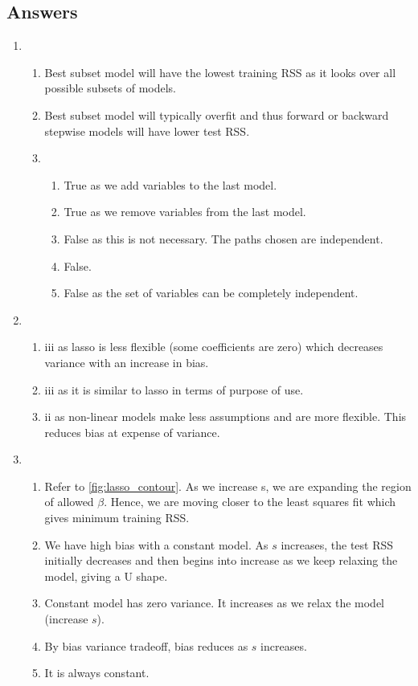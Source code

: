 \documentclass[../statistical_learning_notes.tex]{subfiles}
\begin{document}
    \subsection{Answers}
    \begin{enumerate}
        \item
        \begin{enumerate}
            \item Best subset model will have the lowest training RSS as it looks over all possible subsets of models.
            \item Best subset model will typically overfit and thus forward or backward stepwise models will have lower test RSS.
            \item
            \begin{enumerate}
                \item True as we add variables to the last model.
                \item True as we remove variables from the last model.
                \item False as this is not necessary. The paths chosen are independent.
                \item False.
                \item False as the set of variables can be completely independent.
            \end{enumerate}
        \end{enumerate}

        \item
        \begin{enumerate}
            \item iii as lasso is less flexible (some coefficients are zero) which decreases variance with an increase in bias.
            \item iii as it is similar to lasso in terms of purpose of use.
            \item ii as non-linear models make less assumptions and are more flexible. This reduces bias at expense of variance.
        \end{enumerate}
        
        \item
        \begin{enumerate}
            \item Refer to \ref{fig:lasso_contour}. As we increase s, we are expanding the region of allowed $\beta$. Hence, we are moving closer to the least squares fit which gives minimum training RSS.
            \item We have high bias with a constant model. As $s$ increases, the test RSS initially decreases and then begins into increase as we keep relaxing the model, giving a U shape.
            \item Constant model has zero variance. It increases as we relax the model (increase $s$).
            \item By bias variance tradeoff, bias reduces as $s$ increases.
            \item It is always constant.
        \end{enumerate}


\end{enumerate}
\end{document}
